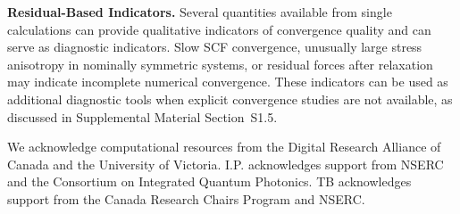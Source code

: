 \documentclass[prb,twocolumn,superscriptaddress,amsmath,amssymb,longbibliography]{revtex4-2}
\begin{document}
{\bf Residual-Based Indicators.}
Several quantities available from single calculations can provide qualitative indicators of convergence 
quality and can serve as diagnostic indicators. Slow SCF convergence, unusually large stress anisotropy in nominally symmetric systems, or residual forces after relaxation may indicate incomplete numerical convergence. These indicators can be used as additional diagnostic tools when explicit convergence studies are not available, as discussed in Supplemental Material Section~S1.5.  




\begin{acknowledgments}

We acknowledge computational resources from the Digital Research Alliance of 
Canada and the University of Victoria. I.P. acknowledges support from NSERC and the  Consortium on Integrated Quantum Photonics. TB acknowledges support from the Canada Research Chairs Program and NSERC. 


\end{acknowledgments}
\end{document}
